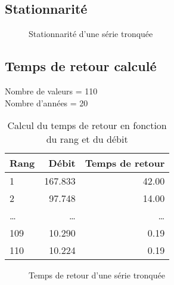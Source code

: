 \subsection{Stationnarité}
\begin{figure}[H]
    \centering
    \resizebox*{0.45\textwidth}{!}{
        
    }
    \caption{Stationnarité d'une série tronquée}
    \label{graph:stationnarite_serieTronquee}
\end{figure}

\subsection{Temps de retour calculé}
Nombre de valeurs = 110 \\
Nombre d'années = 20
\begin{multicols}{2}
    \begin{table}[H]
        \centering
        \begin{tabular}{l|r|r}
            \toprule
            \textbf{Rang} & \textbf{Débit} & \textbf{Temps de retour} \\
            \midrule
            1             & 167.833        & 42.00                    \\
            2             & 97.748         & 14.00                    \\
            \dots         & \dots          & \dots                    \\
            109           & 10.290         & 0.19                     \\
            110           & 10.224         & 0.19                     \\
            \bottomrule
        \end{tabular}
        \caption{Calcul du temps de retour en fonction du rang et du débit}
        \label{tab:serieTronquee_tempsRetour}
    \end{table}

    \columnbreak

    \begin{figure}[H]
        \centering
        \resizebox*{0.45\textwidth}{!}{
            
        }
        \caption{Temps de retour d'une série tronquée}
        \label{graph:tempsRetour_serieTronquee}
    \end{figure}
\end{multicols}

